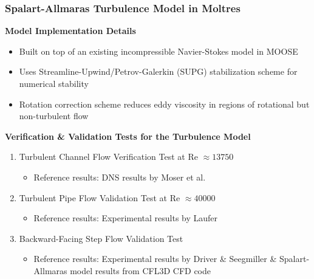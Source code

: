 \begin{frame}
  \frametitle{Spalart-Allmaras Turbulence Model in Moltres}
  \begin{block}{\textbf{Model Implementation Details}}
  \begin{itemize}
    \item Built on top of an existing incompressible Navier-Stokes model in MOOSE
    \item Uses Streamline-Upwind/Petrov-Galerkin (SUPG) stabilization scheme for numerical stability
    \item Rotation correction scheme \cite{aupoix_extensions_2003, dacles-mariani_numericalexperimental_1995}
      reduces eddy viscosity in regions of rotational but non-turbulent flow
  \end{itemize}
  \end{block}
  \pause
  \begin{block}{\textbf{Verification \& Validation Tests for the Turbulence Model}}
    \begin{enumerate}
      \item Turbulent Channel Flow Verification Test at Re $\approx 13750$
      \begin{itemize}
        \item Reference results: \gls{DNS} results by Moser et al.\ \cite{moser_direct_1999}
      \end{itemize}
      \item Turbulent Pipe Flow Validation Test at Re $\approx 40000$
      \begin{itemize}
        \item Reference results: Experimental results by Laufer \cite{laufer_structure_1954}
      \end{itemize}
      \item Backward-Facing Step Flow Validation Test
      \begin{itemize}
        \item Reference results: Experimental results by Driver \& Seegmiller \cite{driver_features_1985}
        \& Spalart-Allmaras model results from CFL3D CFD code \cite{krist_cfl3d_1998}
      \end{itemize}
    \end{enumerate}
  \end{block}
\end{frame}

